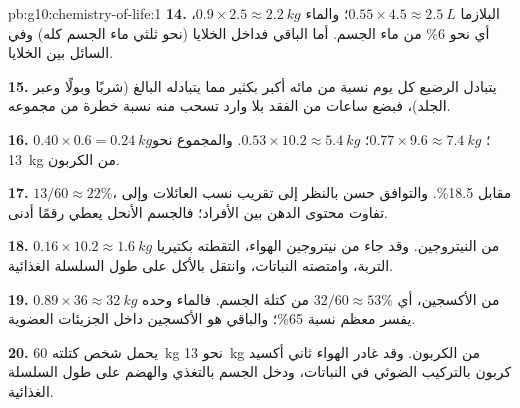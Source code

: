 \begin{solution}{pb:g10:chemistry-of-life:1}
\textbf{14.} البلازما $0.55 \times 4.5 \approx \qty{2.5}{L}$؛ والماء $0.9
\times 2.5 \approx \qty{2.2}{kg}$، أي نحو 6\% من ماء الجسم. أما الباقي
فداخل الخلايا (نحو ثلثي ماء الجسم كله) وفي السائل بين الخلايا.

\textbf{15.} يتبادل الرضيع كل يوم نسبة من مائه أكبر بكثير مما يتبادله
البالغ (شربًا وبولًا وعبر الجلد)، فبضع ساعات من الفقد بلا وارد تسحب
منه نسبة خطرة من مجموعه.

\textbf{16.}  $0.40 \times 0.6 = \qty{0.24}{kg}$؛ 
$0.77 \times 9.6 \approx \qty{7.4}{kg}$؛  $0.53 \times 10.2
\approx \qty{5.4}{kg}$. والمجموع نحو \qty{13}{kg} من الكربون.

\textbf{17.} $13/60 \approx 22\%$، مقابل 18.5\%. والتوافق حسن بالنظر
إلى تقريب نسب العائلات وإلى تفاوت محتوى الدهن بين الأفراد؛ فالجسم
الأنحل يعطي رقمًا أدنى.

\textbf{18.} $0.16 \times 10.2 \approx \qty{1.6}{kg}$ من النيتروجين.
وقد جاء من نيتروجين الهواء، التقطته بكتيريا التربة، وامتصته النباتات،
وانتقل بالأكل على طول السلسلة الغذائية.

\textbf{19.} $0.89 \times 36 \approx \qty{32}{kg}$ من الأكسجين، أي
$32/60 \approx 53\%$ من كتلة الجسم. فالماء وحده يفسر معظم نسبة
65\%؛ والباقي هو الأكسجين داخل الجزيئات العضوية.

\textbf{20.} يحمل شخص كتلته \qty{60}{kg} نحو \qty{13}{kg} من الكربون.
وقد غادر الهواء ثاني أكسيد كربون بالتركيب الضوئي في النباتات، ودخل
الجسم بالتغذي والهضم على طول السلسلة الغذائية.
\end{solution}
